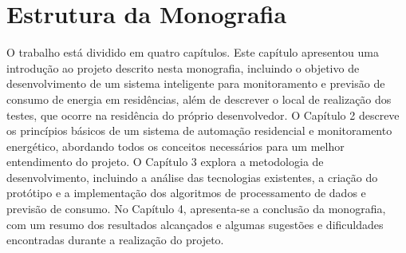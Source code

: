 \section{Estrutura da Monografia}
\label{sec:organizacao}

O trabalho está dividido em quatro capítulos. Este capítulo apresentou uma introdução ao projeto descrito nesta monografia, incluindo o objetivo de desenvolvimento de um sistema inteligente para monitoramento e previsão de consumo de energia em residências, além de descrever o local de realização dos testes, que ocorre na residência do próprio desenvolvedor. O Capítulo 2 descreve os princípios básicos de um sistema de automação residencial e monitoramento energético, abordando todos os conceitos necessários para um melhor entendimento do projeto. O Capítulo 3 explora a metodologia de desenvolvimento, incluindo a análise das tecnologias existentes, a criação do protótipo e a implementação dos algoritmos de processamento de dados e previsão de consumo. No Capítulo 4, apresenta-se a conclusão da monografia, com um resumo dos resultados alcançados e algumas sugestões e dificuldades encontradas durante a realização do projeto.

\clearpage
